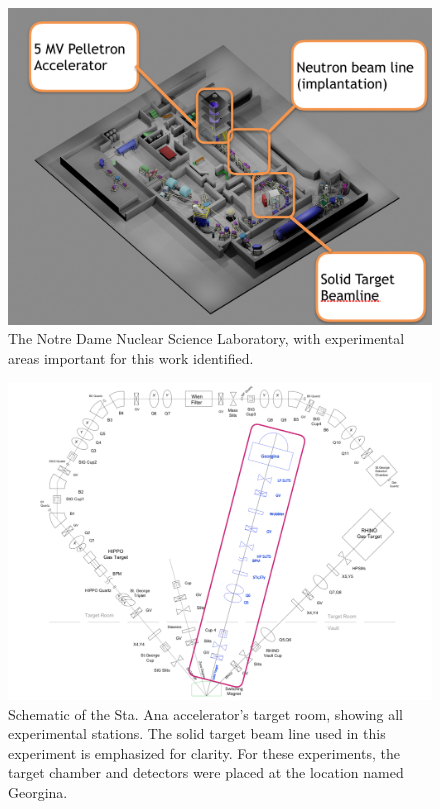\begin{figure}
\includegraphics[width=\linewidth]{figures/nslLab.png}
\caption{The Notre Dame Nuclear Science Laboratory, with experimental areas important for this work identified. }
\label{fig: nsl}
\end{figure}

\begin{figure}
\includegraphics[width=\linewidth]{figures/targetRoom.pdf}
\caption{Schematic of the Sta. Ana accelerator's target room, showing all experimental stations. The solid target beam line used in this experiment is emphasized for clarity. For these experiments, the target chamber and detectors were placed at the location named Georgina. } 
\label{fig: targetRoom}
\end{figure}


